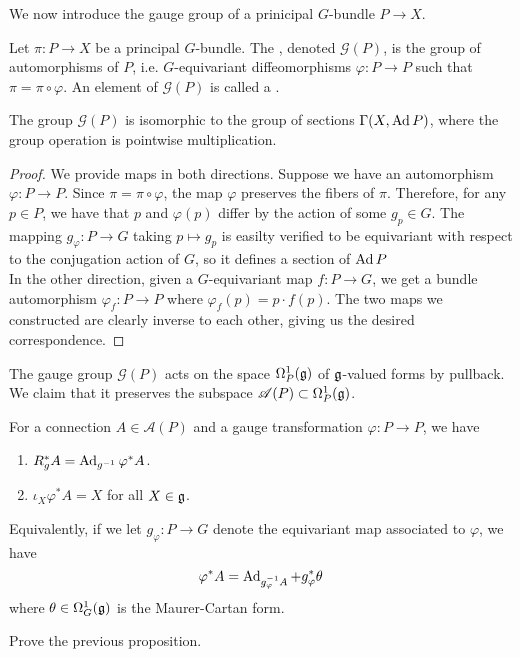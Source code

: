 We now introduce the gauge group of a prinicipal $G$-bundle $P \to X$.
%
\begin{defn}
Let $\pi : P \to X$ be a principal $G$-bundle. The , denoted
$\mathscr{G}(P)$, is the group of automorphisms of $P$, i.e. $G$-equivariant
diffeomorphisms $\varphi : P \to P$ such that $\pi = \pi \circ \varphi$.
An element of $\mathscr{G}(P)$ is called a .
\end{defn}
%
\begin{prop}
The group $\mathscr{G}(P)$ is isomorphic to the group of sections
$\Gamma(X,\operatorname{Ad} P)$, where the group operation is pointwise multiplication.
\end{prop}
%
\begin{proof}
We provide maps in both directions. Suppose we have an automorphism
$\varphi : P \to P$. Since $\pi = \pi \circ \varphi$, the map $\varphi$ preserves
the fibers of $\pi$. Therefore, for any $p \in P$, we have that
$p$ and $\varphi(p)$ differ by the action of some $g_p \in G$. The mapping
$g_\varphi : P \to G$ taking $p \mapsto g_p$ is easilty verified to be
equivariant with respect to the conjugation action of $G$, so it defines
a section of $\operatorname{Ad} P$ \\

In the other direction, given a $G$-equivariant map
$f : P \to G$, we get a bundle automorphism $\varphi_f : P \to P$
where  $\varphi_f(p) = p \cdot f(p)$. The two maps we constructed are clearly inverse
to each other, giving us the desired correspondence.
\end{proof}
%
The gauge group $\mathscr{G}(P)$ acts on the space $\Omega^1_P(\mathfrak{g})$ of
$\mathfrak{g}$-valued forms by pullback. We claim that it preserves the
subspace $\mathscr{A}(P) \subset \Omega^1_P(\mathfrak{g})$.
%
\begin{prop}
For a connection $A \in \mathscr{A}(P)$ and a gauge transformation
$\varphi : P \to P$, we have
\begin{enumerate}
  \item $R_g^*A = \operatorname{Ad}_{g^{-1}}\varphi^*A$.
  \item $\iota_X\varphi^*A = X$ for all $X \in \mathfrak{g}$.
\end{enumerate}
Equivalently, if we let $g_\varphi : P \to G$ denote the equivariant map
associated to $\varphi$, we have
\[
\varphi^*A = \operatorname{Ad}_{g^{-1}_\varphi A} + g_\varphi^*\theta
\]
where $\theta \in \Omega^1_G(\mathfrak{g})$ is the Maurer-Cartan form.
\end{prop}
%
\begin{exer}
Prove the previous proposition.
\end{exer}
